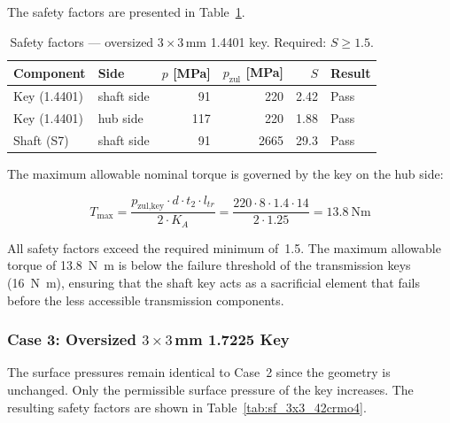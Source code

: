 \documentclass[11pt,a4paper,twoside,openright]{book}
\begin{document}
The safety factors are presented in Table~\ref{tab:sf_3x3_c45}.
 
\begin{table}[htbp]
    \centering
    \begin{tabular}{l l r r r l}
        \hline
        \textbf{Component} & \textbf{Side} & $p$ [\si{\mega\pascal}] & $p_{\text{zul}}$ [\si{\mega\pascal}] & $S$ & \textbf{Result} \\
        \hline
        Key (1.4401)    & shaft side & 91  & 220  & 2.42  & Pass \\
        Key (1.4401)    & hub side   & 117 & 220  & 1.88  & Pass \\
        Shaft (S7)      & shaft side & 91  & 2665 & 29.3  & Pass \\
        \hline
    \end{tabular}
    \caption{Safety factors --- oversized $3 \times 3$\,\si{\milli\metre} 1.4401 key. Required: $S \geq 1.5$.}
    \label{tab:sf_3x3_c45}
\end{table}
 
The maximum allowable nominal torque is governed by the key on the hub side:
 
\begin{equation}
    T_{\max} = \frac{p_{\text{zul,key}} \cdot d \cdot t_2 \cdot l_{tr}}{2 \cdot K_A} = \frac{220 \cdot 8 \cdot 1.4 \cdot 14}{2 \cdot 1.25} = \SI{13.8}{\newton\metre}
    \label{eq:t_max_3x3_c45}
\end{equation}
 
All safety factors exceed the required minimum of~1.5. The maximum allowable torque of \SI{13.8}{\newton\metre} is below the failure threshold of the transmission keys (\SI{16}{\newton\metre}), ensuring that the shaft key acts as a sacrificial element that fails before the less accessible transmission components.
 
\subsubsection{Case 3: Oversized $3 \times 3$\,\si{\milli\metre} 1.7225 Key}
 
The surface pressures remain identical to Case~2 since the geometry is unchanged. Only the permissible surface pressure of the key increases. The resulting safety factors are shown in Table~\ref{tab:sf_3x3_42crmo4}.
 
\end{document}
